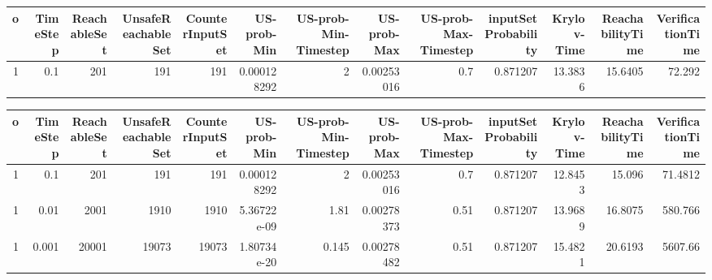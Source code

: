 \begin{tabular}{rrrrrrrrrrrrr}
\hline
   o &   TimeStep &   ReachableSet &   UnsafeReachableSet &   CounterInputSet &   US-prob-Min &   US-prob-Min-Timestep &   US-prob-Max &   US-prob-Max-Timestep &   inputSet Probability &   Krylov-Time &   ReachabilityTime &   VerificationTime \\
\hline
   1 &        0.1 &            201 &                  191 &               191 &   0.000128292 &                      2 &    0.00253016 &                    0.7 &               0.871207 &       13.3836 &            15.6405 &             72.292 \\
\hline
\end{tabular}
\begin{tabular}{rrrrrrrrrrrrr}
\hline
   o &   TimeStep &   ReachableSet &   UnsafeReachableSet &   CounterInputSet &   US-prob-Min &   US-prob-Min-Timestep &   US-prob-Max &   US-prob-Max-Timestep &   inputSet Probability &   Krylov-Time &   ReachabilityTime &   VerificationTime \\
\hline
   1 &      0.1   &            201 &                  191 &               191 &   0.000128292 &                  2     &    0.00253016 &                   0.7  &               0.871207 &       12.8453 &            15.096  &            71.4812 \\
   1 &      0.01  &           2001 &                 1910 &              1910 &   5.36722e-09 &                  1.81  &    0.00278373 &                   0.51 &               0.871207 &       13.9689 &            16.8075 &           580.766  \\
   1 &      0.001 &          20001 &                19073 &             19073 &   1.80734e-20 &                  0.145 &    0.00278482 &                   0.51 &               0.871207 &       15.4821 &            20.6193 &          5607.66   \\
\hline
\end{tabular}
